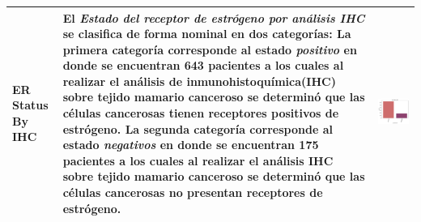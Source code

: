 \begin{table}[!htb]
\begin{threeparttable}
\begin{tabular}{p{2.5cm} p{7cm} p{6.5cm}}
			ER Status By IHC
			&El \textit{Estado del receptor de estrógeno por análisis IHC} se clasifica de forma nominal en dos categorías: La primera categoría corresponde al estado \textit{positivo} en donde se encuentran 643 pacientes a los cuales al realizar el análisis de inmunohistoquímica(IHC) sobre tejido mamario canceroso se determinó que las células cancerosas tienen receptores positivos de estrógeno. La segunda categoría corresponde al estado \textit{negativos} en donde se encuentran 175 pacientes a los cuales al realizar el análisis IHC sobre tejido mamario canceroso se determinó que las células cancerosas no presentan receptores de estrógeno.
			& \begin{center}\includegraphics[width=1\linewidth]{NOTEBOOK/IMAGENES_DESCRIPTIVAS/11_er_status_ihc}\end{center}
			\\ \hline
			
			
		\end{tabular}
	\end{threeparttable}
\end{table}

